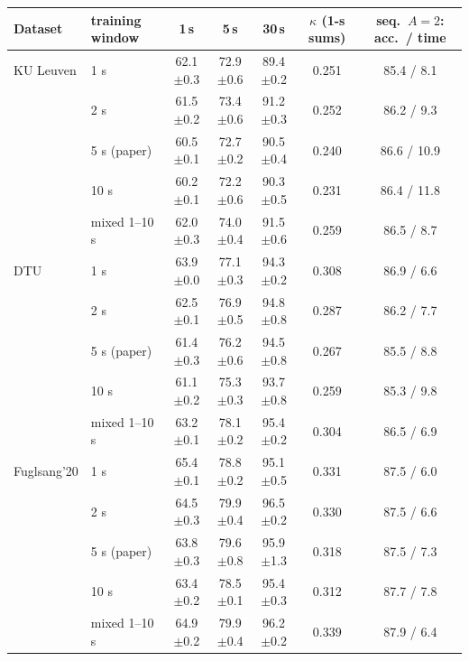 \begin{tabular}{llccccc}\toprule
Dataset & training window & 1\,s & 5\,s & 30\,s & $\kappa$ (1-s sums) & seq.\ $A{=}2$: acc.\ / time \\\midrule
KU Leuven & 1 s & 62.1{\scriptsize$\pm$0.3} & 72.9{\scriptsize$\pm$0.6} & 89.4{\scriptsize$\pm$0.2} & 0.251 & 85.4 / 8.1 \\
 & 2 s & 61.5{\scriptsize$\pm$0.2} & 73.4{\scriptsize$\pm$0.6} & 91.2{\scriptsize$\pm$0.3} & 0.252 & 86.2 / 9.3 \\
 & 5 s (paper) & 60.5{\scriptsize$\pm$0.1} & 72.7{\scriptsize$\pm$0.2} & 90.5{\scriptsize$\pm$0.4} & 0.240 & 86.6 / 10.9 \\
 & 10 s & 60.2{\scriptsize$\pm$0.1} & 72.2{\scriptsize$\pm$0.6} & 90.3{\scriptsize$\pm$0.5} & 0.231 & 86.4 / 11.8 \\
 & mixed 1--10 s & 62.0{\scriptsize$\pm$0.3} & 74.0{\scriptsize$\pm$0.4} & 91.5{\scriptsize$\pm$0.6} & 0.259 & 86.5 / 8.7 \\
\midrule
DTU & 1 s & 63.9{\scriptsize$\pm$0.0} & 77.1{\scriptsize$\pm$0.3} & 94.3{\scriptsize$\pm$0.2} & 0.308 & 86.9 / 6.6 \\
 & 2 s & 62.5{\scriptsize$\pm$0.1} & 76.9{\scriptsize$\pm$0.5} & 94.8{\scriptsize$\pm$0.8} & 0.287 & 86.2 / 7.7 \\
 & 5 s (paper) & 61.4{\scriptsize$\pm$0.3} & 76.2{\scriptsize$\pm$0.6} & 94.5{\scriptsize$\pm$0.8} & 0.267 & 85.5 / 8.8 \\
 & 10 s & 61.1{\scriptsize$\pm$0.2} & 75.3{\scriptsize$\pm$0.3} & 93.7{\scriptsize$\pm$0.8} & 0.259 & 85.3 / 9.8 \\
 & mixed 1--10 s & 63.2{\scriptsize$\pm$0.1} & 78.1{\scriptsize$\pm$0.2} & 95.4{\scriptsize$\pm$0.2} & 0.304 & 86.5 / 6.9 \\
\midrule
Fuglsang'20 & 1 s & 65.4{\scriptsize$\pm$0.1} & 78.8{\scriptsize$\pm$0.2} & 95.1{\scriptsize$\pm$0.5} & 0.331 & 87.5 / 6.0 \\
 & 2 s & 64.5{\scriptsize$\pm$0.3} & 79.9{\scriptsize$\pm$0.4} & 96.5{\scriptsize$\pm$0.2} & 0.330 & 87.5 / 6.6 \\
 & 5 s (paper) & 63.8{\scriptsize$\pm$0.3} & 79.6{\scriptsize$\pm$0.8} & 95.9{\scriptsize$\pm$1.3} & 0.318 & 87.5 / 7.3 \\
 & 10 s & 63.4{\scriptsize$\pm$0.2} & 78.5{\scriptsize$\pm$0.1} & 95.4{\scriptsize$\pm$0.3} & 0.312 & 87.7 / 7.8 \\
 & mixed 1--10 s & 64.9{\scriptsize$\pm$0.2} & 79.9{\scriptsize$\pm$0.4} & 96.2{\scriptsize$\pm$0.2} & 0.339 & 87.9 / 6.4 \\

\end{tabular}

